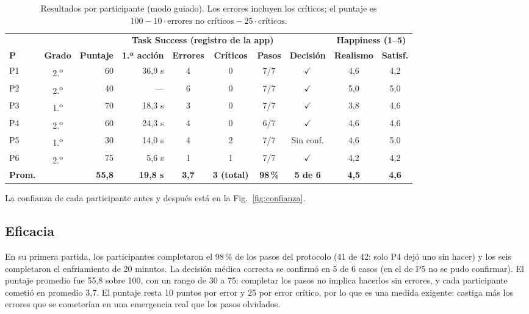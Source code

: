 \documentclass[11pt,a4paper]{article}
\newcommand{\ok}{\(\checkmark\)}
\begin{document}
\begin{table}[htbp]
\centering
\caption{Resultados por participante (modo guiado). Los errores incluyen los críticos; el puntaje es \(100 - 10 \cdot \text{errores no críticos} - 25 \cdot \text{críticos}\).}
\label{tab:porparticipante}
\small
\setlength{\tabcolsep}{4pt}
\begin{tabular}{@{}l c r r c c c c c c@{}}
\toprule
 & & \multicolumn{6}{c}{\textbf{Task Success (registro de la app)}} & \multicolumn{2}{c}{\textbf{Happiness (1--5)}} \\
\cmidrule(lr){3-8}\cmidrule(l){9-10}
\textbf{P} & \textbf{Grado} & \textbf{Puntaje} & \textbf{1.ª acción} & \textbf{Errores} & \textbf{Críticos} & \textbf{Pasos} & \textbf{Decisión} & \textbf{Realismo} & \textbf{Satisf.} \\
\midrule
P1 & 2.\textsuperscript{o} & 60 & 36,9 s & 4 & 0 & 7/7 & \ok & 4,6 & 4,2 \\
P2 & 2.\textsuperscript{o} & 40 & --- & 6 & 0 & 7/7 & \ok & 5,0 & 5,0 \\
P3 & 1.\textsuperscript{o} & 70 & 18,3 s & 3 & 0 & 7/7 & \ok & 3,8 & 4,6 \\
P4 & 2.\textsuperscript{o} & 60 & 24,3 s & 4 & 0 & 6/7 & \ok & 4,6 & 4,6 \\
P5 & 1.\textsuperscript{o} & 30 & 14,0 s & 4 & 2 & 7/7 & Sin conf. & 4,6 & 5,0 \\
P6 & 2.\textsuperscript{o} & 75 & 5,6 s & 1 & 1 & 7/7 & \ok & 4,2 & 4,2 \\
\midrule
\textbf{Prom.} & & \textbf{55,8} & \textbf{19,8 s} & \textbf{3,7} & \textbf{3 (total)} & \textbf{98\,\%} & \textbf{5 de 6} & \textbf{4,5} & \textbf{4,6} \\
\bottomrule
\end{tabular}
\par\smallskip\footnotesize La confianza de cada participante antes y después está en la Fig.~\ref{fig:confianza}.
\end{table}

\subsection{Eficacia}
En su primera partida, los participantes completaron el 98\,\% de los pasos del protocolo (41 de 42: solo P4 dejó uno sin hacer) y los seis completaron el enfriamiento de 20 minutos. La decisión médica correcta se confirmó en 5 de 6 casos (en el de P5 no se pudo confirmar). El puntaje promedio fue 55,8 sobre 100, con un rango de 30 a 75: completar los pasos no implica hacerlos sin errores, y cada participante cometió en promedio 3,7. El puntaje resta 10 puntos por error y 25 por error crítico, por lo que es una medida exigente: castiga más los errores que se cometerían en una emergencia real que los pasos olvidados.
\end{document}
